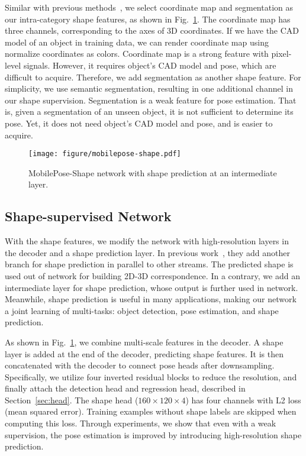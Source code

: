 \documentclass[runningheads]{llncs}
\begin{document}
Similar with previous methods~\cite{Hu_2019_Segmentation,Wang_2019_NOCS,Li_2019_CDPN,Park_2019_Pix2Pose}, we select coordinate map and segmentation as our intra-category shape features, as shown in Fig.~\ref{fig:shape}. The coordinate map has three channels, corresponding to the axes of 3D coordinates. If we have the CAD model of an object in training data, we can render coordinate map using normalize coordinates as colors. Coordinate map is a strong feature with pixel-level signals. However, it requires object's CAD model and pose, which are difficult to acquire. Therefore, we add segmentation as another shape feature. For simplicity, we use semantic segmentation, resulting in one additional channel in our shape supervision. Segmentation is a weak feature for pose estimation. That is, given a segmentation of an unseen object, it is not sufficient to determine its pose. Yet, it does not need object's CAD model and pose, and is easier to acquire.

\begin{figure}[t]
    \centering
    \texttt{[image: figure/mobilepose-shape.pdf]}
    \caption{MobilePose-Shape network with shape prediction at an intermediate layer.}
    \label{fig:shape}
\end{figure}

\subsection{Shape-supervised Network}
With the shape features, we modify the network with high-resolution layers in the decoder and a shape prediction layer. In previous work~\cite{Hu_2019_Segmentation,Wang_2019_NOCS,Li_2019_CDPN,Park_2019_Pix2Pose}, they add another branch for shape prediction in parallel to other streams. The predicted shape is used out of network for building 2D-3D correspondence. In a contrary, we add an intermediate layer for shape prediction, whose output is further used in network. Meanwhile, shape prediction is useful in many applications, making our network a joint learning of multi-tasks: object detection, pose estimation, and shape prediction.

As shown in Fig.~\ref{fig:shape}, we combine multi-scale features in the decoder. A shape layer is added at the end of the decoder, predicting shape features. It is then concatenated with the decoder to connect pose heads after downsampling. Specifically, we utilize four inverted residual blocks to reduce the resolution, and finally attach the detection head and regression head, described in Section~\ref{sec:head}. The shape head ($160\times120\times4$) has four channels with L2 loss (mean squared error). Training examples without shape labels are skipped when computing this loss. Through experiments, we show that even with a weak supervision, the pose estimation is improved by introducing high-resolution shape prediction.
\end{document}
